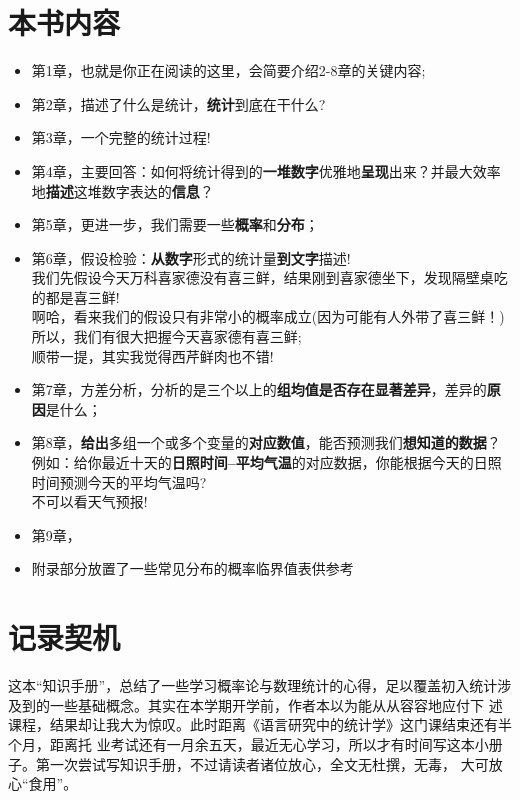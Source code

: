 \documentclass[lang=cn,10pt]{elegantbook}
\begin{document}
\section{本书内容}
\begin{itemize}
  \item 第1章，也就是你正在阅读的这里，会简要介绍2-8章的关键内容;
  \item 第2章，描述了什么是统计，\textbf{统计}到底在干什么?
  \item 第3章，一个完整的统计过程!
  \item 第4章，主要回答：如何将统计得到的\textbf{一堆数字}优雅地\textbf{呈现}出来？并最大效率地\textbf{描述}这堆数字表达的\textbf{信息}？
  \item 第5章，更进一步，我们需要一些\textbf{概率}和\textbf{分布}；
  \item 第6章，假设检验：\textbf{从数字}形式的统计量\textbf{到文字}描述!\\
  我们先假设今天万科喜家德没有喜三鲜，结果刚到喜家德坐下，发现隔壁桌吃的都是喜三鲜!\\
  啊哈，看来我们的假设只有非常小的概率成立(因为可能有人外带了喜三鲜！)\\
  所以，我们有很大把握今天喜家德有喜三鲜;\\
  顺带一提，其实我觉得西芹鲜肉也不错!
  \item 第7章，方差分析，分析的是三个以上的\textbf{组均值是否存在显著差异}，差异的\textbf{原因}是什么；
  \item 第8章，\textbf{给出}多组一个或多个变量的\textbf{对应数值}，能否预测我们\textbf{想知道的数据}？\\
  例如：给你最近十天的\textbf{日照时间--平均气温}的对应数据，你能根据今天的日照时间预测今天的平均气温吗?\\
  不可以看天气预报!
  \item 第9章，
  \item 附录部分放置了一些常见分布的概率临界值表供参考
\end{itemize}


\section{记录契机}
这本“知识手册”，总结了一些学习概率论与数理统计的心得，足以覆盖初入统计涉及到的一些基础概念。其实在本学期开学前，作者本以为能从从容容地应付下
述课程，结果却让我大为惊叹。此时距离《语言研究中的统计学》这门课结束还有半个月，距离托
业考试还有一月余五天，最近无心学习，所以才有时间写这本小册子。第一次尝试写知识手册，不过请读者诸位放心，全文无杜撰，无毒，
大可放心“食用”。
\end{document}
